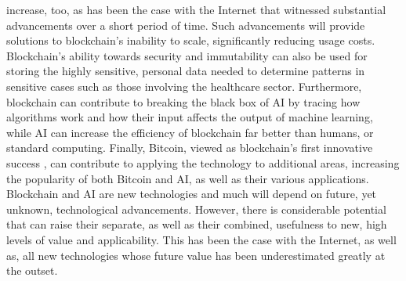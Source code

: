 increase, too, as has been the case with the Internet that witnessed substantial advancements over
a short period of time. Such advancements will provide solutions to blockchain’s inability to scale,
significantly reducing usage costs.
Blockchain’s ability towards security and immutability can also be used for storing the highly
sensitive, personal data needed to determine patterns in sensitive cases such as those involving the
healthcare sector. Furthermore, blockchain can contribute to breaking the black box of AI by tracing
how algorithms work and how their input affects the output of machine learning, while AI can increase
the efficiency of blockchain far better than humans, or standard computing. Finally, Bitcoin, viewed as
blockchain’s first innovative success , can contribute to applying the technology to additional areas,
increasing the popularity of both Bitcoin and AI, as well as their various applications. Blockchain and
AI are new technologies and much will depend on future, yet unknown, technological advancements.
However, there is considerable potential that can raise their separate, as well as their combined,
usefulness to new, high levels of value and applicability. This has been the case with the Internet, as
well as, all new technologies whose future value has been underestimated greatly at the outset.

